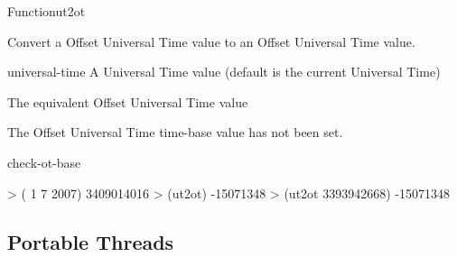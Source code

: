 \documentclass[10pt,twoside,english,pdftex]{article}
\begin{document}
\begin{functiondoc}{Function}{ut2ot}{ 
  \returns{} }
%

\fnsyntax

\fnpurpose Convert a Offset Universal Time value to an Offset Universal 
Time value.

\fnpackage {}

\fnmodule {}

\fnargs
\begin{args}{universal-time}
 A Universal Time value (default is the current
   Universal Time)
\end{args}

\fnreturns The equivalent Offset Universal Time value

\fnerrors The Offset Universal Time time-base value has not been set.

\begin{alsos}{check-ot-base}
\also[ot2ut]
\end{alsos}

\fnexamples
\begin{example}
> ( 1 7 2007)
3409014016
> (ut2ot)
-15071348
> (ut2ot 3393942668)
-15071348
\end{example}

\end{functiondoc}


\T\markright{}%
\T\pagestyle{plain}
\T\clearpage
\W{}
\T\pagestyle{fancy}
\T\thispagestyle{fancybottom}
\T\global\def\fnlastname{ }%

\subsection{Portable Threads}
\label{sec:portablethreads}%




\T\markright{}%
\T\pagestyle{plain}
\T\clearpage
\W{}
\T\pagestyle{fancy}
\T\thispagestyle{fancybottom}
\T\global\def\fnlastname{ }%
\end{document}
